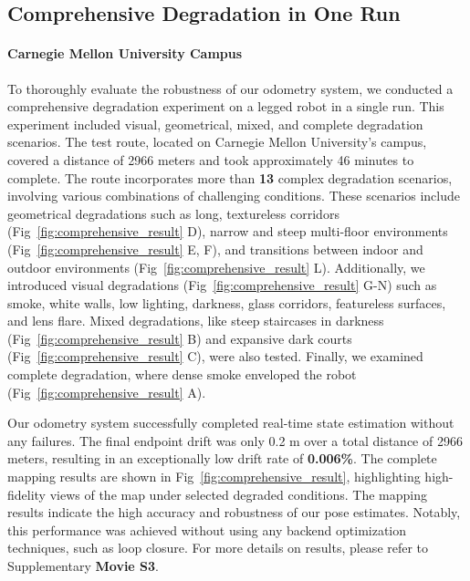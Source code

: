 \subsection{Comprehensive Degradation in One Run} 

\paragraph{Carnegie Mellon University Campus}
To thoroughly evaluate the robustness of our odometry system, we conducted a comprehensive degradation experiment on a legged robot in a single run. This experiment included visual, geometrical, mixed, and complete degradation scenarios. The test route, located on Carnegie Mellon University's campus, covered a distance of 2966 meters and took approximately 46 minutes to complete. The route incorporates more than \textbf{13} complex degradation scenarios, involving various combinations of challenging conditions. These scenarios include geometrical degradations such as long, textureless corridors (Fig~\ref{fig:comprehensive_result} D), narrow and steep multi-floor environments (Fig~\ref{fig:comprehensive_result} E, F), and transitions between indoor and outdoor environments (Fig~\ref{fig:comprehensive_result} L). Additionally, we introduced visual degradations (Fig~\ref{fig:comprehensive_result} G-N) such as smoke, white walls, low lighting, darkness, glass corridors, featureless surfaces, and lens flare. Mixed degradations, like steep staircases in darkness (Fig~\ref{fig:comprehensive_result} B) and expansive dark courts (Fig~\ref{fig:comprehensive_result} C), were also tested. Finally, we examined complete degradation, where dense smoke enveloped the robot (Fig~\ref{fig:comprehensive_result} A).
 
Our odometry system successfully completed real-time state estimation without any failures. The final endpoint drift was only 0.2 m over a total distance of 2966 meters, resulting in an exceptionally low drift rate of \textbf{0.006\%}. The complete mapping results are shown in Fig~\ref{fig:comprehensive_result}, highlighting high-fidelity views of the map under selected degraded conditions. The mapping results indicate the high accuracy and robustness of our pose estimates.  Notably, this performance was achieved without using any backend optimization techniques, such as loop closure. For more details on results, please refer to Supplementary \textbf{Movie S3}.


